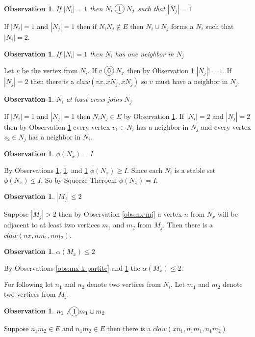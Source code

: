 \documentclass[12pt]{article}
\newcommand*\circled[1]{\tikz[baseline=(char.base)]{
            \node[shape=circle,draw,inner sep=2pt] (char) {#1};}}
\newtheorem{Observation}[Theorem]{Observation}
\begin{document}
\begin{Observation}\label{obs:ni-join-1}
If $|N_i| = 1$ then $N_i \;\circled{1}\; N_j$ such that $|N_j| = 1$
\end{Observation}
 If $|N_i| = 1$ and $|N_j| = 1$ then if $N_iN_j \not \in E$ then $N_i \cup N_j$ forms a $N_i$ such that $|N_i| = 2$.

\begin{Observation}\label{obs:ni-1-neighbor}
If $|N_i| = 1$ then $N_i$ has one neighbor in $N_j$
\end{Observation}
 Let $v$ be the vertex from $N_i$. If $v \;\circled{0}\; N_j$ then by Observation \ref{obs:ni-join-1} $|N_j| != 1$. If $|N_j| = 2$ then there is a $claw (vx, xN_j, xN_j)$ so $v$ must have a neighbor in $N_j$.

\begin{Observation}\label{obs:ni-2-neighbor}
$N_i$ at least cross joins $N_j$
\end{Observation}
 If $|N_i| = 1$ and $|N_j| = 1$ then $N_iN_j \in E$ by Observation \ref{obs:ni-join-1}. If $|N_i| = 2$ and $|N_j| = 2$ then by Observation \ref{obs:ni-1-neighbor} every vertex $v_1 \in N_i$ has a neighbor in $N_j$ and every vertex $v_2 \in N_j$ has a neighbor in $N_i$.

\begin{Observation}\label{obs:nx-clique}
$\phi(N_x) = I$
\end{Observation} 
 By Observations \ref{obs:ni-join-1}, \ref{obs:ni-1-neighbor}, and \ref{obs:ni-2-neighbor} $\phi(N_x) \geq I$. Since each $N_i$ is a stable set $\phi(N_x) \leq I$. So by Squeeze Theroem $\phi(N_x) = I$.



\begin{Observation}\label{obs:mj-2}
$|M_j| \leq 2$
\end{Observation}
 Suppose $|M_j| > 2$ then by Observation \ref{obs:nx-mj} a vertex $n$ from $N_x$ will be adjacent to at least two vertices $m_1$ and $m_2$ from $M_j$. Then there is a $claw (nx, nm_1, nm_2)$.

\begin{Observation}\label{obs:alpha-mx}
$\alpha(M_x) \leq 2$
\end{Observation}
 By Observations \ref{obs:mx-k-partite} and \ref{obs:mj-2} the $\alpha(M_x) \leq 2$.

For following let $n_1$ and $n_2$ denote two vertices from $N_i$. Let $m_1$ and $m_2$ denote two vertices from $M_j$.
\begin{Observation}\label{obs:ni-cant-join-mi}
$n_1 \not \;\circled{1} m_1 \cup m_2$ 
\end{Observation}
 Suppose $n_1m_2 \in E$ and $n_1m_2 \in E$ then there is a $claw(xn_1, n_1m_1, n_1m_2)$
\end{document}
